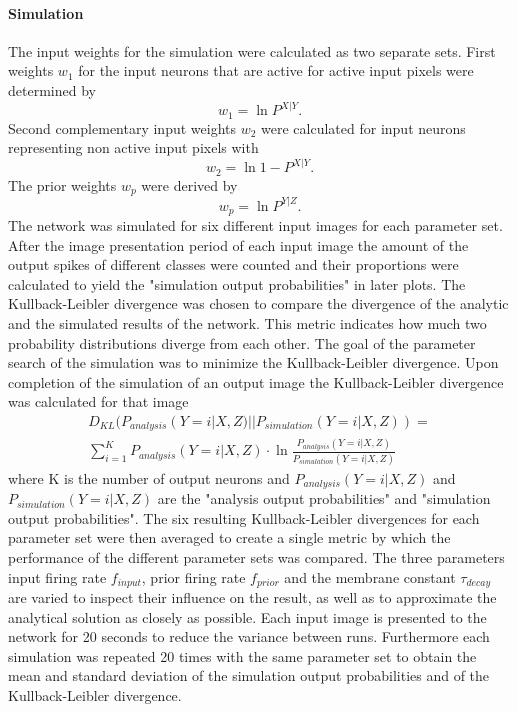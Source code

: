 \paragraph{Simulation}
The input weights for the simulation were calculated as two separate sets. First weights $w_1$ for the input neurons that are active for active input pixels were determined by 
\begin{equation}
\label{eqn:1DWeights}
w_1 = \ln{P^{X|Y}}.
\end{equation}
Second complementary input weights $w_2$ were calculated for  input neurons representing non active input pixels with
\begin{equation}
\label{eqn:1DWeightsComplementary}
w_2 = \ln{1 - P^{X|Y}}.
\end{equation} 
The prior weights $w_p$ were derived by 
\begin{equation}
\label{eqn:1DWeightsPrior}
w_p = \ln{P^{Y|Z}}.
\end{equation}
The network was simulated for six different input images for each parameter set. After the image presentation period of each input image the amount of the output spikes of different classes were counted and their proportions were calculated to yield the "simulation output probabilities" in later plots. The Kullback-Leibler divergence was chosen to compare the divergence of the analytic and the simulated results of the network. This metric indicates how much two probability distributions diverge from each other. The goal of the parameter search of the simulation was to minimize the Kullback-Leibler divergence. Upon completion of the simulation of an output image the Kullback-Leibler divergence was calculated for that image
\begin{equation}
\begin{split}
\label{eqn:KLDivergence}
D_{KL}(P_{analysis}(Y = i|X, Z)||P_{simulation}(Y = i|X, Z)) = \\ \sum_{i=1}^K P_{analysis}(Y = i|X, Z) \cdot \ln{ \frac{P_{analysis}(Y = i|X, Z)}{P_{simulation}(Y = i|X, Z)}}
\end{split}
\end{equation}
where K is the number of output neurons and $P_{analysis}(Y = i|X, Z)$ and $P_{simulation}(Y = i|X, Z)$ are the "analysis output probabilities" and "simulation output probabilities". The six resulting Kullback-Leibler divergences for each parameter set were then averaged to create a single metric by which the performance of the different parameter sets was compared. The three parameters input firing rate $f_{input}$, prior firing rate $f_{prior}$ and the membrane constant $\tau_{decay}$ are varied to inspect their influence on the result, as well as to approximate the analytical solution as closely as possible. Each input image is presented to the network for 20 seconds to reduce the variance between runs. Furthermore each simulation was repeated 20 times with the same parameter set to obtain the mean and standard deviation of the simulation output probabilities and of the Kullback-Leibler divergence.


